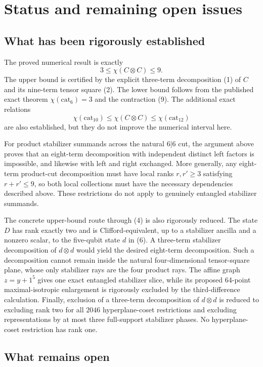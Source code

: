 \documentclass[11pt]{article}
\theoremstyle{definition}
\newcommand{\cat}{\mathrm{cat}}
\begin{document}
\section{Status and remaining open issues}

\subsection*{What has been rigorously established}

The proved numerical result is exactly
\[
\boxed{3\leq\chi(C\otimes C)\leq9.}
\]
The upper bound is certified by the explicit three-term decomposition (1) of $C$ and its nine-term tensor square (2). The lower bound follows from the published exact theorem $\chi(\cat_6)=3$ and the contraction (9). The additional exact relations
\[
\chi(\cat_{10})\leq\chi(C\otimes C)\leq\chi(\cat_{12})
\]
are also established, but they do not improve the numerical interval here.

For product stabilizer summands across the natural $6|6$ cut, the argument above proves that an eight-term decomposition with independent distinct left factors is impossible, and likewise with left and right exchanged. More generally, any eight-term product-cut decomposition must have local ranks $r,r'\geq3$ satisfying $r+r'\leq9$, so both local collections must have the necessary dependencies described above. These restrictions do not apply to genuinely entangled stabilizer summands.

The concrete upper-bound route through (4) is also rigorously reduced. The state $D$ has rank exactly two and is Clifford-equivalent, up to a stabilizer ancilla and a nonzero scalar, to the five-qubit state $d$ in (6). A three-term stabilizer decomposition of $d\otimes d$ would yield the desired eight-term decomposition. Such a decomposition cannot remain inside the natural four-dimensional tensor-square plane, whose only stabilizer rays are the four product rays. The affine graph $z=y+1^5$ gives one exact entangled stabilizer slice, while its proposed 64-point maximal-isotropic enlargement is rigorously excluded by the third-difference calculation. Finally, exclusion of a three-term decomposition of $d\otimes d$ is reduced to excluding rank two for all $2046$ hyperplane-coset restrictions and excluding representations by at most three full-support stabilizer phases. No hyperplane-coset restriction has rank one.

\subsection*{What remains open}
\end{document}
